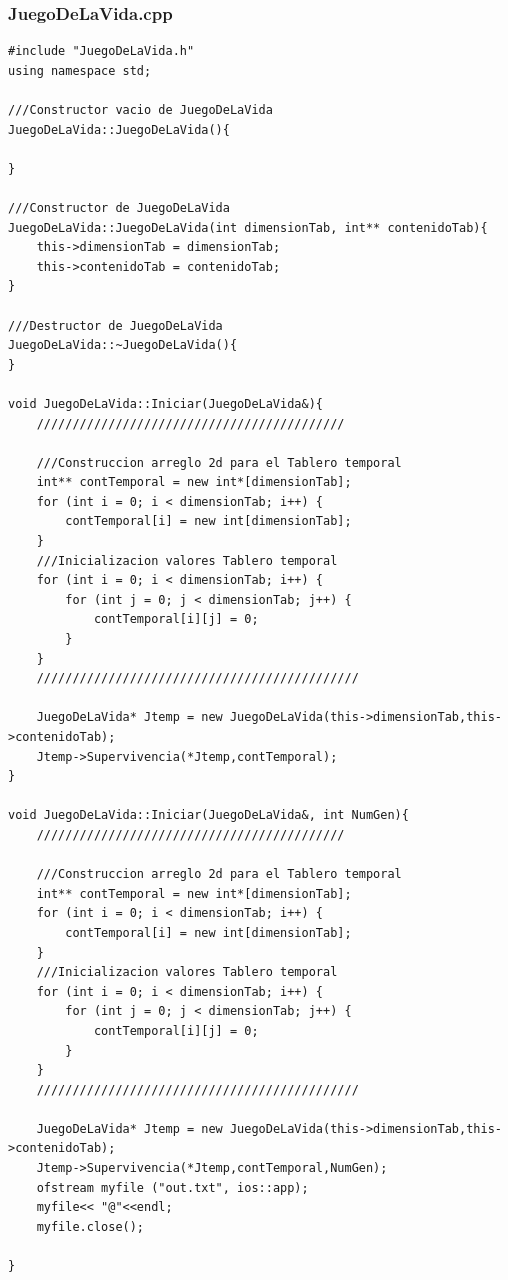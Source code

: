 \documentclass[12pt,letterpaper]{article}
\begin{document}
\subsubsection{JuegoDeLaVida.cpp}
\lstset {language=C}
\begin{lstlisting}
#include "JuegoDeLaVida.h"
using namespace std;

///Constructor vacio de JuegoDeLaVida
JuegoDeLaVida::JuegoDeLaVida(){
    
}

///Constructor de JuegoDeLaVida
JuegoDeLaVida::JuegoDeLaVida(int dimensionTab, int** contenidoTab){
    this->dimensionTab = dimensionTab;
    this->contenidoTab = contenidoTab;
}

///Destructor de JuegoDeLaVida
JuegoDeLaVida::~JuegoDeLaVida(){
}

void JuegoDeLaVida::Iniciar(JuegoDeLaVida&){
    ///////////////////////////////////////////
    
    ///Construccion arreglo 2d para el Tablero temporal
    int** contTemporal = new int*[dimensionTab];
    for (int i = 0; i < dimensionTab; i++) {
        contTemporal[i] = new int[dimensionTab];
    }
    ///Inicializacion valores Tablero temporal
    for (int i = 0; i < dimensionTab; i++) {
        for (int j = 0; j < dimensionTab; j++) {
            contTemporal[i][j] = 0;
        }
    }
    /////////////////////////////////////////////
    
    JuegoDeLaVida* Jtemp = new JuegoDeLaVida(this->dimensionTab,this->contenidoTab);
    Jtemp->Supervivencia(*Jtemp,contTemporal);
}

void JuegoDeLaVida::Iniciar(JuegoDeLaVida&, int NumGen){
    ///////////////////////////////////////////
    
    ///Construccion arreglo 2d para el Tablero temporal
    int** contTemporal = new int*[dimensionTab];
    for (int i = 0; i < dimensionTab; i++) {
        contTemporal[i] = new int[dimensionTab];
    }
    ///Inicializacion valores Tablero temporal
    for (int i = 0; i < dimensionTab; i++) {
        for (int j = 0; j < dimensionTab; j++) {
            contTemporal[i][j] = 0;
        }
    }
    /////////////////////////////////////////////
    
    JuegoDeLaVida* Jtemp = new JuegoDeLaVida(this->dimensionTab,this->contenidoTab);
    Jtemp->Supervivencia(*Jtemp,contTemporal,NumGen);
    ofstream myfile ("out.txt", ios::app);
    myfile<< "@"<<endl;
    myfile.close();
    
}


\end{lstlisting}
\end{document}
